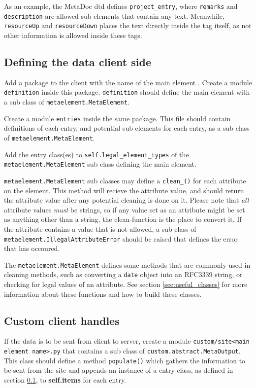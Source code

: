 As an example, the MetaDoc \gls{dtd} \cite{metadoc_dtd} defines
\texttt{project\_entry}, where \texttt{remarks} and \texttt{description} are
allowed sub-elements that contain any text. Meanwhile, \texttt{resourceUp} and
\texttt{resourceDown} places the text directly inside the tag itself, as not
other information is allowed inside these tags.

\subsection{Defining the data client side}
\label{sec:defclientmodel}
Add a package to the client with the name of the main element
\cite{python_modules}. Create a module \texttt{definition} inside this package.
\texttt{definition} should define the main element with a sub class of
\texttt{metaelement.MetaElement}.

Create a module \texttt{entries} inside the same package. This file should
contain definitions of each entry, and potential sub elements for each entry,
as a sub class of \texttt{metaelement.MetaElement}. 

Add the entry class(es) to \texttt{self.legal\_element\_types} of the \\ 
\texttt{metaelement.MetaElement} sub class defining the main element. 

\texttt{metaelement.MetaElement} sub classes may define a
\texttt{clean\_<attribute name>()} for each attribute on the element. This
method will recieve the attribute value, and should return the attribute value
after any potential cleaning is done on it. Please note that \textit{all}
attribute values \textit{must} be strings, so if any value set as an attribute
might be set as anything other than a string, the clean-function is the place
to convert it. If the attribute contains a value that is not allowed, a sub
class of \texttt{metaelement.IllegalAttributeError} should be raised that
defines the error that has occoured. 

The \texttt{metaelement.MetaElement} defines some methods that are commonly
used in cleaning methods, such as converting a \texttt{date} object into an
RFC3339 string, or checking for legal values of an attribute. See section
\ref{sec:useful_classes} for more information about these functions and how to
build these classes.

\subsection{Custom client handles}
If the data is to be sent from client to server, create a module
\texttt{custom/site<main element name>.py} that contains a sub class of
\texttt{custom.abstract.MetaOutput}. This class should define a method
\texttt{populate()} which gathers the information to be sent from the site and
appends an instance of a entry-class, as defined in section
\ref{sec:defclientmodel}, to \textbf{self.items} for each entry.

